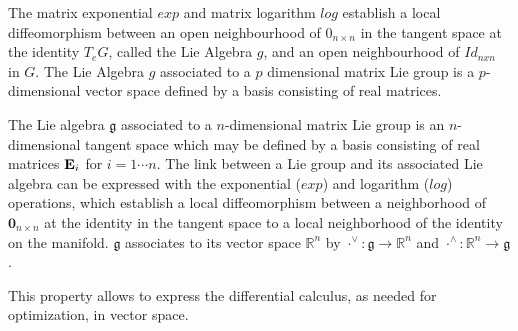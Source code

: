 \documentclass[a4paper,12pt]{report}
\begin{document}
The matrix exponential $exp$ and matrix logarithm $log$ establish a local
diffeomorphism between an open neighbourhood of $0_{n \times n}$ in the
tangent space at the identity $T_eG$, called the Lie Algebra $g$, and an
open neighbourhood of $Id_{nxn}$ in $G$. The Lie Algebra $g$ associated to a
$p$ dimensional matrix Lie group is a $p$-dimensional vector space defined
by a basis consisting of real matrices.


The Lie algebra $\mathfrak{g}$ associated to a $n$-dimensional matrix Lie group is an $n$-dimensional tangent space which may be defined by a basis consisting of real matrices $\bold{E}_i$ for $i=1 \cdots n$. The link between a Lie group and its associated Lie algebra can be expressed with the exponential ($exp$) and logarithm ($log$) operations, which establish a local diffeomorphism between a neighborhood of $\bm{0}_{n \times n}$ at the identity in the tangent space to a local neighborhood of the identity on the manifold. $\mathfrak{g}$ associates to its vector space $\mathbb{R}^{n}$ by ${\cdot}^{\vee}: \mathfrak{g} \to \mathbb{R}^n$ and ${\cdot}^{\land}: \mathbb{R}^n \to \mathfrak{g}$.

This property allows to express the differential calculus, as needed for optimization, in vector space.
\end{document}
